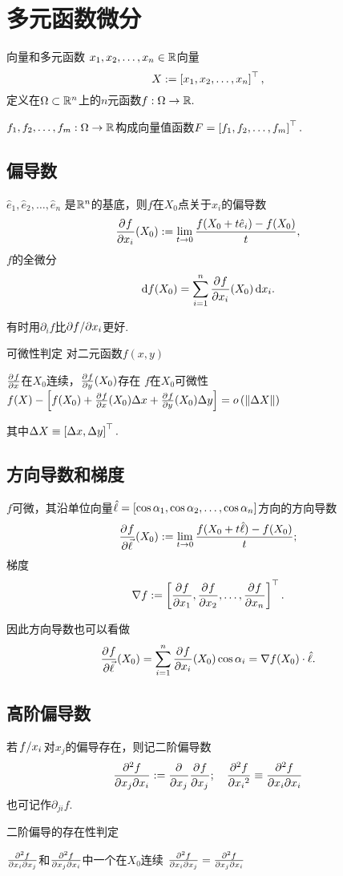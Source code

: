 \chapter{多元函数微分}
\begin{definition}{向量和多元函数}{}
	$x_1,x_2,\ldots,x_n\in\RR$向量
	\[
		X:=\fkh{x_1,x_2,\ldots,x_n}\tp,
	\]
	定义在$\Omega\subset\RR^n$上的$n$元函数$f:\Omega\to\RR.$
\end{definition}
$f_1,f_2,\ldots,f_m:\Omega\to\RR$构成向量值函数$F=\fkh{f_1,f_2,\ldots,f_m}\tp.$
\section{偏导数}
\begin{definition}{}{}
	$\hat e_1,\hat e_2,\ldots,\hat e_n$ 是$\RR^n$的基底，则$f$在$X_0$点关于$x_i$的偏导数
	\[
		\pv f{x_i}(X_0):=\lim_{t\to 0}\frac{f(X_0+t\hat e_i)-f(X_0)}t,
	\]
	$f$的全微分
	\begin{align}
		\d f(X_0)=\sum_{i=1}^n\pv f{x_i}(X_0)\d x_i.
	\end{align}
\end{definition}
有时用$\partial_if$比$\p f/\p x_i$更好.
\begin{theorem}{可微性判定}{}
	对二元函数$f(x,y)$
	\begin{center}
		$\pv fx$在$X_0$连续，$\pv fy(X_0)$存在
		\vthus
		$f$在$X_0$可微性
		\viff
		$f(X)-\fkh{f(X_0)+\pv fx(X_0)\Delta x+\pv fy(X_0)\Delta y}=o\kh{\norm{\Delta X}}$
	\end{center}
	其中$\D X\equiv\fkh{\D x,\D y}\tp.$
\end{theorem}
\section{方向导数和梯度}
\begin{definition}{}{}
	$f$可微，其沿单位向量$\hat \ell=\fkh{\cos\alpha_1,\cos\alpha_2,\ldots,\cos\alpha_n}$方向的方向导数 %
	\[
		\pv f{\vec \ell}(X_0):=\lim_{t\to 0}\frac{f(X_0+t\hat \ell)-f(X_0)}t;
	\]
	梯度
	\[
		\nabla f:=\left[\pv f{x_1},\pv f{x_2},\ldots,\pv f{x_n}\right]\tp.
	\]
\end{definition}
因此方向导数也可以看做
\begin{align}
	\pv f{\vec \ell}(X_0)=\sum_{i=1}^n\pv f{x_i}(X_0)\cos\alpha_i=\nabla f(X_0)\cdot\hat \ell.
\end{align}
\section{高阶偏导数}
\begin{definition}{}{}
	若$\dvd f{x_i}$对$x_j$的偏导存在，则记二阶偏导数
	\[
		\pw f{x_j}{x_i}:=\pp{x_j}\pv f{x_j};\quad \pv[2]f{x_i}\equiv\pw f{x_i}{x_i}
	\]
	也可记作$\partial_{ji}f.$
\end{definition}
\begin{theorem}{二阶偏导的存在性判定}{}
	\begin{center}
		$\pw f{x_i}{x_j}$和$\pw f{x_j}{x_i}$中一个在$X_0$连续
		\vthus
		$\pw f{x_i}{x_j}=\pw f{x_j}{x_i}$
	\end{center}
\end{theorem}
